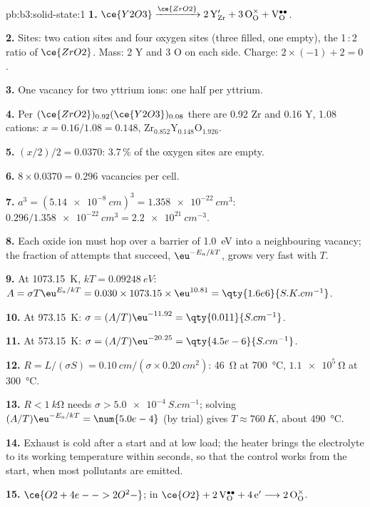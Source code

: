 \begin{solution}{pb:b3:solid-state:1}
\textbf{1.} $\ce{Y2O3} \xrightarrow{\ce{ZrO2}} \mathrm{2\,Y_{Zr}' + 3\,O_O^{\times} + V_O^{\bullet\bullet}}$.

\textbf{2.} Sites: two cation sites and four oxygen sites (three filled, one empty),
the 1\,:\,2 ratio of $\ce{ZrO2}$. Mass: 2 Y and 3 O on each side. Charge: $2 \times (-1) + 2 = 0$.

\textbf{3.} One vacancy for two yttrium ions: one half per yttrium.

\textbf{4.} Per $(\ce{ZrO2})_{0.92}(\ce{Y2O3})_{0.08}$ there are 0.92 Zr and 0.16 Y, 1.08 cations: $x = 0.16/1.08 = 0.148$,
$\mathrm{Zr_{0.852}Y_{0.148}O_{1.926}}$.

\textbf{5.} $(x/2)/2 = 0.0370$: 3.7\,\% of the oxygen sites are empty.

\textbf{6.} $8 \times 0.0370 = 0.296$ vacancies per cell.

\textbf{7.} $a^3 = (\qty{5.14e-8}{cm})^3 = \qty{1.358e-22}{cm^3}$: $0.296/\qty{1.358e-22}{cm^3} = \qty{2.2e21}{cm^{-3}}$.

\textbf{8.} Each oxide ion must hop over a barrier of \qty{1.0}{eV} into a neighbouring
vacancy; the fraction of attempts that succeed, $\eu^{-E_a/kT}$, grows very fast with $T$.

\textbf{9.} At \qty{1073.15}{K}, $kT = \qty{0.09248}{eV}$: $A = \sigma T\eu^{E_a/kT} = 0.030 \times 1073.15 \times \eu^{10.81} = \qty{1.6e6}{S.K.cm^{-1}}$.

\textbf{10.} At \qty{973.15}{K}: $\sigma = (A/T)\eu^{-11.92} = \qty{0.011}{S.cm^{-1}}$.

\textbf{11.} At \qty{573.15}{K}: $\sigma = (A/T)\eu^{-20.25} = \qty{4.5e-6}{S.cm^{-1}}$.

\textbf{12.} $R = L/(\sigma S) = \qty{0.10}{cm}/(\sigma \times \qty{0.20}{cm^2})$: \qty{46}{\ohm} at \qty{700}{\celsius}, $\qty{1.1e5}{\ohm}$ at \qty{300}{\celsius}.

\textbf{13.} $R < \qty{1}{k\ohm}$ needs $\sigma > \qty{5.0e-4}{S.cm^{-1}}$; solving $(A/T)\eu^{-E_a/kT} = \num{5.0e-4}$ (by trial)
gives $T \approx \qty{760}{K}$, about \qty{490}{\celsius}.

\textbf{14.} Exhaust is cold after a start and at low load; the heater brings the
electrolyte to its working temperature within seconds, so that the control
works from the start, when most pollutants are emitted.

\textbf{15.} $\ce{O2 + 4e- -> 2O^2-}$; in  $\ce{O2} + \mathrm{2\,V_O^{\bullet\bullet} + 4\,e'} \longrightarrow \mathrm{2\,O_O^{\times}}$.


\end{solution}
